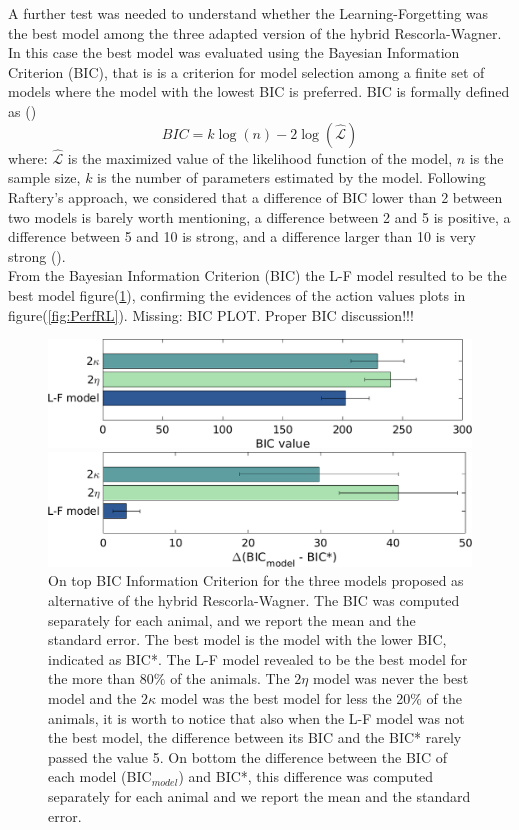 A further test was needed to understand whether the Learning-Forgetting was the best model among the three adapted version of the hybrid Rescorla-Wagner. In this case the best model was evaluated using the Bayesian Information Criterion (BIC), that is is a criterion for model selection among a finite set of models where the model with the lowest BIC is preferred. BIC is formally defined as (\cite{Schwarz})
\begin{equation}
    BIC=k\log(n)-2\log(\hat{\mathcal{L}})
\end{equation}
where:
${\hat{\mathcal{L}}}$ is the maximized value of the likelihood function of the model, $n$ is the sample size, $k$ is the number of parameters estimated by the model.
Following Raftery’s approach, we considered that a difference of BIC lower than 2 between two models is barely worth mentioning, a difference between 2 and 5 is positive, a difference between 5 and 10 is strong, and a difference larger than 10 is very strong (\cite{Raftery}).\\
From the Bayesian Information Criterion (BIC) the L-F model resulted to be the best model figure(\ref{fig:BIC}), confirming the evidences of the action values plots in figure(\ref{fig:PerfRL}).
{\color{red}Missing: BIC PLOT. Proper BIC discussion!!! }
\begin{figure}
    \centering
    \includegraphics[scale=0.5]{figures/BIC_Value.png}
    
    \vspace{1cm}
    
    \includegraphics[scale=0.5]{figures/DeltaBIC.png}
    \caption{On top BIC Information Criterion for the three models proposed as alternative of the hybrid Rescorla-Wagner. The BIC was computed separately for each animal, and we report the mean and the standard error. The best model is the model with the lower BIC, indicated as BIC*. The L-F model revealed to be the best model for the more than 80$\%$ of the animals. The $2\eta$ model was never the best model and the $2\kappa$ model was the best model for less the 20$\%$ of the animals, it is worth to notice that also when the L-F model was not the best model, the difference between its BIC and the BIC* rarely passed the value 5. On bottom the difference between the BIC of each model (BIC$_{model}$) and BIC*, this difference was computed separately for each animal and we report the mean and the standard error.}
    \label{fig:BIC}
\end{figure}
